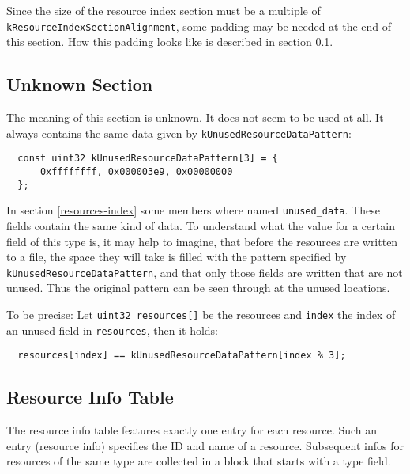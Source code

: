 \documentclass[12pt, a4paper]{article}
\newcommand{\code}[1]{{\tt #1}}
\newcommand{\codeblockbegin}{\begin{flushleft}\begin{minipage}{\textwidth}}
\newcommand{\codeblockend}{\end{minipage}\end{flushleft}}
\begin{document}
Since the size of the resource index section must be a multiple of
\code{kResourceIndexSectionAlignment}, some padding may be needed at the end
of this section. How this padding looks like is described in section
\ref{resources-unknown}.


\subsection{Unknown Section}
\label{resources-unknown}

The meaning of this section is unknown. It does not seem to be used at all.
It always contains the same data given by \code{kUnusedResourceDataPattern}:
%
\codeblockbegin
\begin{verbatim}
  const uint32 kUnusedResourceDataPattern[3] = {
      0xffffffff, 0x000003e9, 0x00000000
  };
\end{verbatim}
\codeblockend
%
In section \ref{resources-index} some members where named \code{unused\_data}.
These fields contain the same kind of data. To understand what the value for a
certain field of this type is, it may help to imagine, that before the
resources are written to a file, the space they will take is filled with the
pattern specified by \code{kUnusedResourceDataPattern}, and that only those
fields are written that are not unused. Thus the original pattern can be seen
through at the unused locations.

To be precise: Let \verb|uint32 resources[]| be the resources and
\code{index} the index of an unused field in \code{resources}, then it holds:
%
\begin{verbatim}
  resources[index] == kUnusedResourceDataPattern[index % 3];
\end{verbatim}
%


\subsection{Resource Info Table}
\label{resources-infotable}

The resource info table features exactly one entry for each resource.
Such an entry (resource info) specifies the ID and name of a
resource. Subsequent infos for resources of the same type are collected in
a block that starts with a type field.
\end{document}
